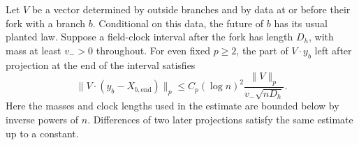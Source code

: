 \begin{lemma}\label{comp:projection}
Let $V$ be a vector determined by outside branches and by data at or
before their fork with a branch $b$.  Conditional on this data, the
future of $b$ has its usual planted law.  Suppose a field-clock interval
after the fork has length $D_h$, with mass at least $v_->0$ throughout.
For even fixed $p\ge2$, the part of $V\cdot y_b$ left after projection
at the end of the interval satisfies
\begin{equation}
 \|V\cdot(y_b-X_{b,\mathrm{end}})\|_p
 \le C_p(\log n)^2\frac{\|V\|_p}{v_-\sqrt{nD_h}}.
 \tag{13}\label{eq:13}
\end{equation}
Here the masses and clock lengths used in the estimate are bounded
below by inverse powers of $n$.  Differences of two later projections
satisfy the same estimate up to a constant.
\end{lemma}

